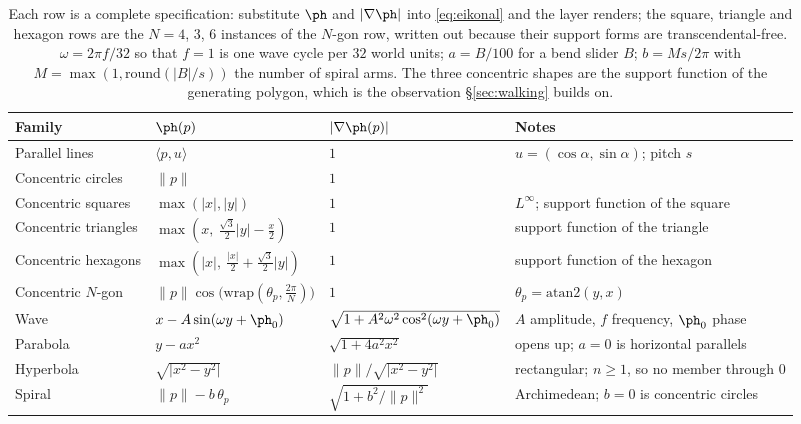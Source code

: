 \begin{table}[t]
  \centering
  \caption{ Each row is a complete
  specification: substitute $\ph$ and $\lvert\nabla\ph\rvert$ into
  \eqref{eq:eikonal} and the layer renders; the square, triangle and
  hexagon rows are the $N=4$, $3$, $6$ instances of the $N$-gon row, written
  out because their support forms are transcendental-free. $\omega=2\pi f/32$ so that
  $f=1$ is one wave cycle per $32$ world units; $a=B/100$ for a bend slider $B$;
  $b=Ms/2\pi$ with $M=\max(1,\mathrm{round}(\lvert B\rvert/s))$ the number of
  spiral arms. The three concentric shapes are the support function of the
  generating polygon, which is the observation \S\ref{sec:walking} builds on.}
  \label{tab:catalog}
  \small
  \begin{tabular}{@{}llll@{}}
    \toprule
    Family & $\ph(p)$ & $\lvert\nabla\ph(p)\rvert$ & Notes \\
    \midrule
    Parallel lines
      & $\langle p,u\rangle$
      & $1$
      & $u=(\cos\alpha,\sin\alpha)$; pitch $s$ \\
    Concentric circles
      & $\lVert p\rVert$
      & $1$
      & \\
    Concentric squares
      & $\max(\lvert x\rvert,\lvert y\rvert)$
      & $1$
      & $L^\infty$; support function of the square \\
    Concentric triangles
      & $\max\!\left(x,\ \tfrac{\sqrt3}{2}\lvert y\rvert-\tfrac{x}{2}\right)$
      & $1$
      & support function of the triangle \\
    Concentric hexagons
      & $\max\!\left(\lvert x\rvert,\ \tfrac{\lvert x\rvert}{2}+\tfrac{\sqrt3}{2}\lvert y\rvert\right)$
      & $1$
      & support function of the hexagon \\
    Concentric $N$-gon
      & $\lVert p\rVert\cos\!\big(\mathrm{wrap}(\theta_p,\tfrac{2\pi}{N})\big)$
      & $1$
      & $\theta_p=\mathrm{atan2}(y,x)$ \\
    Wave
      & $x-A\sin(\omega y+\ph_0)$
      & $\sqrt{1+A^2\omega^2\cos^2(\omega y+\ph_0)}$
      & $A$ amplitude, $f$ frequency, $\ph_0$ phase \\
    Parabola
      & $y-a x^2$
      & $\sqrt{1+4a^2x^2}$
      & opens up; $a=0$ is horizontal parallels \\
    Hyperbola
      & $\sqrt{\lvert x^2-y^2\rvert}$
      & $\lVert p\rVert/\sqrt{\lvert x^2-y^2\rvert}$
      & rectangular; $n\ge1$, so no member through $0$ \\
    Spiral
      & $\lVert p\rVert-b\,\theta_p$
      & $\sqrt{1+b^2/\lVert p\rVert^2}$
      & Archimedean; $b=0$ is concentric circles \\
    \bottomrule
  \end{tabular}
\end{table}

